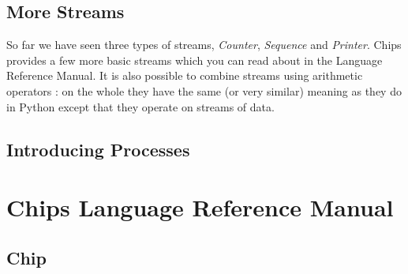 \documentclass[letterpaper,10pt,english]{manual}
\begin{document}
\section{More Streams}

So far we have seen three types of streams, \emph{Counter}, \emph{Sequence} and
\emph{Printer}. Chips provides a few more basic streams which you can read about
in the Language Reference Manual. It is also possible to combine streams
using arithmetic operators : \code{+, -, *, //, \%, \textless{}\textless{}, \textgreater{}\textgreater{}, \&, \textbar{}, \textasciicircum{}, ==, !=, \textless{},
\textless{}=, \textgreater{}, \textgreater{}=} on the whole they have the same (or very similar) meaning as
they do in Python except that they operate on streams of data.
\begin{quote}
\end{quote}


\section{Introducing Processes}

\resetcurrentobjects
\hypertarget{--doc-language\_reference/index}{}

\chapter{Chips Language Reference Manual}


\section{Chip}
\end{document}
